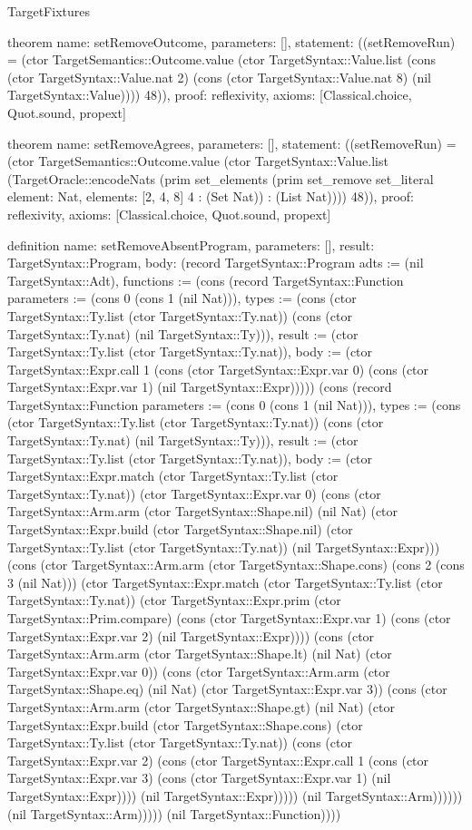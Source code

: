 \begin{lexlean}{TargetFixtures}
\begin{semanticmodule}
theorem{
  name: setRemoveOutcome,
  parameters: [],
  statement: ((setRemoveRun) = (ctor TargetSemantics::Outcome.value (ctor TargetSyntax::Value.list (cons (ctor TargetSyntax::Value.nat 2) (cons (ctor TargetSyntax::Value.nat 8) (nil TargetSyntax::Value)))) 48)),
  proof: reflexivity{},
  axioms: [Classical.choice, Quot.sound, propext]
}

theorem{
  name: setRemoveAgrees,
  parameters: [],
  statement: ((setRemoveRun) = (ctor TargetSemantics::Outcome.value (ctor TargetSyntax::Value.list (TargetOracle::encodeNats (prim set_elements (prim set_remove set_literal{
    element: Nat,
    elements: [2, 4, 8]
  } 4 : (Set Nat)) : (List Nat)))) 48)),
  proof: reflexivity{},
  axioms: [Classical.choice, Quot.sound, propext]
}

definition{
  name: setRemoveAbsentProgram,
  parameters: [],
  result: TargetSyntax::Program,
  body: (record TargetSyntax::Program {adts := (nil TargetSyntax::Adt), functions := (cons (record TargetSyntax::Function {parameters := (cons 0 (cons 1 (nil Nat))), types := (cons (ctor TargetSyntax::Ty.list (ctor TargetSyntax::Ty.nat)) (cons (ctor TargetSyntax::Ty.nat) (nil TargetSyntax::Ty))), result := (ctor TargetSyntax::Ty.list (ctor TargetSyntax::Ty.nat)), body := (ctor TargetSyntax::Expr.call 1 (cons (ctor TargetSyntax::Expr.var 0) (cons (ctor TargetSyntax::Expr.var 1) (nil TargetSyntax::Expr))))}) (cons (record TargetSyntax::Function {parameters := (cons 0 (cons 1 (nil Nat))), types := (cons (ctor TargetSyntax::Ty.list (ctor TargetSyntax::Ty.nat)) (cons (ctor TargetSyntax::Ty.nat) (nil TargetSyntax::Ty))), result := (ctor TargetSyntax::Ty.list (ctor TargetSyntax::Ty.nat)), body := (ctor TargetSyntax::Expr.match (ctor TargetSyntax::Ty.list (ctor TargetSyntax::Ty.nat)) (ctor TargetSyntax::Expr.var 0) (cons (ctor TargetSyntax::Arm.arm (ctor TargetSyntax::Shape.nil) (nil Nat) (ctor TargetSyntax::Expr.build (ctor TargetSyntax::Shape.nil) (ctor TargetSyntax::Ty.list (ctor TargetSyntax::Ty.nat)) (nil TargetSyntax::Expr))) (cons (ctor TargetSyntax::Arm.arm (ctor TargetSyntax::Shape.cons) (cons 2 (cons 3 (nil Nat))) (ctor TargetSyntax::Expr.match (ctor TargetSyntax::Ty.list (ctor TargetSyntax::Ty.nat)) (ctor TargetSyntax::Expr.prim (ctor TargetSyntax::Prim.compare) (cons (ctor TargetSyntax::Expr.var 1) (cons (ctor TargetSyntax::Expr.var 2) (nil TargetSyntax::Expr)))) (cons (ctor TargetSyntax::Arm.arm (ctor TargetSyntax::Shape.lt) (nil Nat) (ctor TargetSyntax::Expr.var 0)) (cons (ctor TargetSyntax::Arm.arm (ctor TargetSyntax::Shape.eq) (nil Nat) (ctor TargetSyntax::Expr.var 3)) (cons (ctor TargetSyntax::Arm.arm (ctor TargetSyntax::Shape.gt) (nil Nat) (ctor TargetSyntax::Expr.build (ctor TargetSyntax::Shape.cons) (ctor TargetSyntax::Ty.list (ctor TargetSyntax::Ty.nat)) (cons (ctor TargetSyntax::Expr.var 2) (cons (ctor TargetSyntax::Expr.call 1 (cons (ctor TargetSyntax::Expr.var 3) (cons (ctor TargetSyntax::Expr.var 1) (nil TargetSyntax::Expr)))) (nil TargetSyntax::Expr))))) (nil TargetSyntax::Arm)))))) (nil TargetSyntax::Arm))))}) (nil TargetSyntax::Function)))})
}


\end{semanticmodule}
\end{lexlean}

